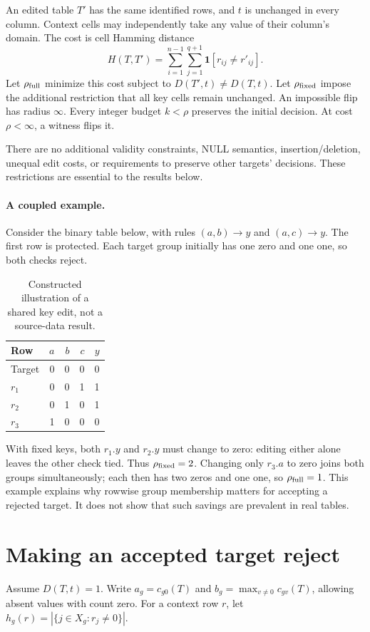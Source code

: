 \documentclass[11pt]{article}
\newcommand{\ind}{\mathbf{1}}
\newcommand{\INF}{\infty}
\begin{document}
An edited table $T'$ has the same identified rows, and $t$ is unchanged in every
column. Context cells may independently take any value of their column's
domain. The cost is cell Hamming distance
\[
 H(T,T')=\sum_{i=1}^{n-1}\sum_{j=1}^{q+1}\ind[r_{ij}\ne r'_{ij}].
\]
Let $\rho_{\rm full}$ minimize this cost subject to $D(T',t)\ne D(T,t)$.
Let $\rho_{\rm fixed}$ impose the additional restriction that all key cells
remain unchanged. An impossible flip has radius $\INF$. Every integer budget
$k<\rho$ preserves the initial decision. At cost $\rho<\INF$, a witness flips it.

There are no additional validity constraints, NULL semantics, insertion/deletion,
unequal edit costs, or requirements to preserve other targets' decisions. These
restrictions are essential to the results below.


\paragraph{A coupled example.}
Consider the binary table below, with rules $(a,b)\to y$ and $(a,c)\to y$.
The first row is protected. Each target group initially has one zero and one
one, so both checks reject.
\begin{table}[H]
\centering\small
\begin{tabular}{lrrrr}
\toprule
Row & $a$ & $b$ & $c$ & $y$\\
\midrule
Target &0&0&0&0\\
$r_1$ &0&0&1&1\\
$r_2$ &0&1&0&1\\
$r_3$ &1&0&0&0\\
\bottomrule
\end{tabular}
\caption{Constructed illustration of a shared key edit, not a source-data result.}
\end{table}
With fixed keys, both $r_1.y$ and $r_2.y$ must change to zero: editing either
alone leaves the other check tied. Thus $\rho_{\rm fixed}=2$.
Changing only $r_3.a$ to zero joins both groups simultaneously; each then has
two zeros and one one, so $\rho_{\rm full}=1$. This example explains why
rowwise group membership matters for accepting a rejected target. It does not
show that such savings are prevalent in real tables.

\section{Making an accepted target reject}
Assume $D(T,t)=1$. Write $a_g=c_{g0}(T)$ and
$b_g=\max_{v\ne0}c_{gv}(T)$, allowing absent values with count zero.
For a context row $r$, let
$h_g(r)=|\{j\in X_g:r_j\ne0\}|$.
\end{document}
